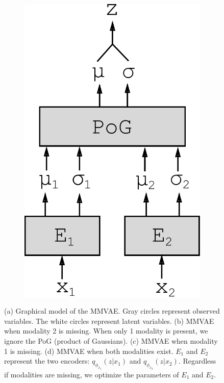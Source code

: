 \documentclass{article}
\begin{document}
\begin{figure}[h!]
\begin{subfigure}[b]{.15\linewidth}
        \includegraphics[width=.75\linewidth]{modelv3}
        \caption{}
        \label{fig:diagram:modelv3}
    \end{subfigure}
    \caption{(a) Graphical model of the MMVAE. Gray circles represent observed variables. The white circles represent latent variables. (b) MMVAE when modality 2 is missing. When only 1 modality is present, we ignore the PoG (product of Gaussians). (c) MMVAE when modality 1 is missing. (d) MMVAE when both modalities exist. $E_{1}$ and $E_{2}$ represent the two encoders: $q_{\phi_{x_{1}}}(z | x_{1})$ and $q_{\phi_{x_{2}}}(z | x_{2})$. Regardless if modalities are missing, we optimize the parameters of $E_{1}$ and $E_{2}$.}
    \label{fig:diagram}
\end{figure}
\end{document}
